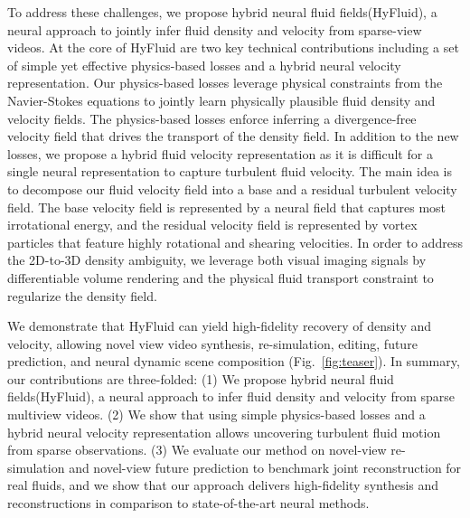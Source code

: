 \documentclass{article}
\newcommand{\fig}[1]{Fig.~\ref{#1}}
\newcommand{\modelfull}{hybrid neural fluid fields\xspace}
\newcommand{\model}{HyFluid\xspace}
\begin{document}
To address these challenges, we propose \modelfull (\model), a neural approach to jointly infer fluid density and velocity from sparse-view videos. At the core of \model are two key technical contributions including a set of simple yet effective physics-based losses and a hybrid neural velocity representation. 
Our physics-based losses leverage physical constraints from the Navier-Stokes equations to jointly learn physically plausible fluid density and velocity fields. The physics-based losses enforce inferring a divergence-free velocity field that drives the transport of the density field. In addition to the new losses, we propose a hybrid fluid velocity representation as it is difficult for a single neural representation to capture turbulent fluid velocity. The main idea is to decompose our fluid velocity field into a base and a residual turbulent velocity field. The base velocity field is represented by a neural field that captures most irrotational energy, and the residual velocity field is represented by vortex particles that feature highly rotational and shearing velocities. In order to address the 2D-to-3D density ambiguity, we leverage both visual imaging signals by differentiable volume rendering and the physical fluid transport constraint to regularize the density field.

We demonstrate that \model can yield high-fidelity recovery of density and velocity, allowing novel view video synthesis, re-simulation, editing, future prediction, and neural dynamic scene composition (\fig{fig:teaser}). In summary, our contributions are three-folded: (1) We propose \modelfull (\model), a neural approach to infer fluid density and velocity from sparse multiview videos. (2) We show that using simple physics-based losses and a hybrid neural velocity representation allows uncovering turbulent fluid motion from sparse observations. (3) We evaluate our method on novel-view re-simulation and novel-view future prediction to benchmark joint reconstruction for real fluids, and we show that our approach delivers high-fidelity synthesis and reconstructions in comparison to state-of-the-art neural methods.
\end{document}
